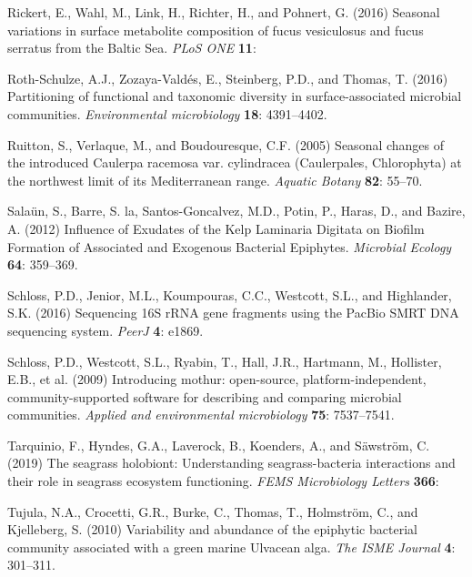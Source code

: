 \documentclass[12pt,]{article}
\begin{document}
\leavevmode\hypertarget{ref-Rickert2016}{}%
Rickert, E., Wahl, M., Link, H., Richter, H., and Pohnert, G. (2016)
Seasonal variations in surface metabolite composition of fucus
vesiculosus and fucus serratus from the Baltic Sea. \emph{PLoS ONE}
\textbf{11}:

\leavevmode\hypertarget{ref-Roth-Schulze2016}{}%
Roth-Schulze, A.J., Zozaya-Valdés, E., Steinberg, P.D., and Thomas, T.
(2016) Partitioning of functional and taxonomic diversity in
surface-associated microbial communities. \emph{Environmental
microbiology} \textbf{18}: 4391--4402.

\leavevmode\hypertarget{ref-Ruitton2005}{}%
Ruitton, S., Verlaque, M., and Boudouresque, C.F. (2005) Seasonal
changes of the introduced Caulerpa racemosa var. cylindracea
(Caulerpales, Chlorophyta) at the northwest limit of its Mediterranean
range. \emph{Aquatic Botany} \textbf{82}: 55--70.

\leavevmode\hypertarget{ref-Salaun2012}{}%
Salaün, S., Barre, S. la, Santos-Goncalvez, M.D., Potin, P., Haras, D.,
and Bazire, A. (2012) Influence of Exudates of the Kelp Laminaria
Digitata on Biofilm Formation of Associated and Exogenous Bacterial
Epiphytes. \emph{Microbial Ecology} \textbf{64}: 359--369.

\leavevmode\hypertarget{ref-Schloss2016a}{}%
Schloss, P.D., Jenior, M.L., Koumpouras, C.C., Westcott, S.L., and
Highlander, S.K. (2016) Sequencing 16S rRNA gene fragments using the
PacBio SMRT DNA sequencing system. \emph{PeerJ} \textbf{4}: e1869.

\leavevmode\hypertarget{ref-Schloss2009}{}%
Schloss, P.D., Westcott, S.L., Ryabin, T., Hall, J.R., Hartmann, M.,
Hollister, E.B., et al. (2009) Introducing mothur: open-source,
platform-independent, community-supported software for describing and
comparing microbial communities. \emph{Applied and environmental
microbiology} \textbf{75}: 7537--7541.

\leavevmode\hypertarget{ref-Tarquinio2019}{}%
Tarquinio, F., Hyndes, G.A., Laverock, B., Koenders, A., and Säwström,
C. (2019) The seagrass holobiont: Understanding seagrass-bacteria
interactions and their role in seagrass ecosystem functioning.
\emph{FEMS Microbiology Letters} \textbf{366}:

\leavevmode\hypertarget{ref-Tujula2010}{}%
Tujula, N.A., Crocetti, G.R., Burke, C., Thomas, T., Holmström, C., and
Kjelleberg, S. (2010) Variability and abundance of the epiphytic
bacterial community associated with a green marine Ulvacean alga.
\emph{The ISME Journal} \textbf{4}: 301--311.
\end{document}
